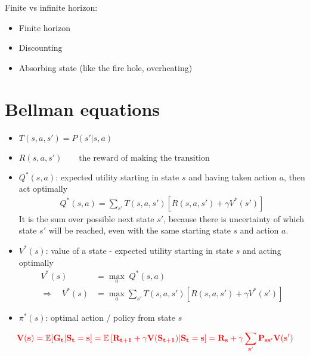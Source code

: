 Finite \ac{vs} infinite horizon: \todo{}

\begin{itemize}
	\item Finite horizon
	\item Discounting
	\item Absorbing state (like the fire hole, overheating)
\end{itemize}

\section{Bellman equations}
\begin{itemize}
	\item $T(s, a, s') = P(s'| s, a)$ \qquad {}
	\item $R(s, a, s') \qquad \text{the reward of making the transition}$
	\item $Q^*(s, a)$: expected utility starting in state $s$ and having taken action $a$, then act optimally
	\begin{align}
		Q^*(s, a) = \sum_{s'} T(s, a, s') \left[ R(s, a, s') + \gamma V^*(s') \right]
	\end{align}
	It is the sum over possible next state $s'$, because there is uncertainty of which state $s'$ will be reached, even with the same starting state $s$ and action $a$.
	\item $V^*(s)$: value of a state - expected utility starting in state $s$ and acting optimally
	\begin{align}
		V^*(s) & = \underset{a}{\max}\;Q^*(s, a)\\
		\Rightarrow \quad V^*(s) & = \underset{a}{\max} \sum_{s'} T(s, a, s') \left[ R(s, a, s') + \gamma V^*(s') \right]
	\end{align}
	
	\item $\pi^*(s)$: optimal action / policy from state $s$
\end{itemize}

\begin{equation}
	\textbf{\color{red} $\displaystyle \mathbf{V(s) = \mathbb{E}[G_t|S_t = s] = \mathbb{E}\left[ R_{t+1} + \gamma V(S_{t+1}) | S_t = s \right] = R_s + \gamma\sum_{s'} P_{ss'} V(s')}$}
\end{equation}

